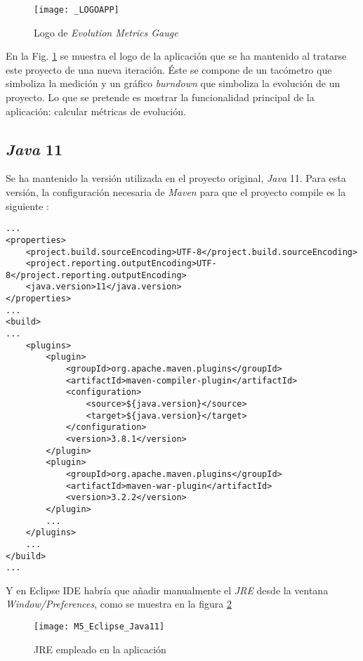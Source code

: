 \begin{figure}[!h]
	\centering
	\texttt{[image: \_LOGOAPP]}
	\caption{Logo de \textit{Evolution Metrics Gauge}}\label{fig:_LOGOAPP}
\end{figure}
\FloatBarrier

En la Fig. \ref{fig:_LOGOAPP} se muestra el logo de la aplicación que se ha mantenido al tratarse este proyecto de una nueva iteración. Éste se compone de un tacómetro que simboliza la medición y un gráfico \textit{burndown} que simboliza la evolución de un proyecto. Lo que se pretende es mostrar la funcionalidad principal de la aplicación: calcular métricas de evolución.


\subsection{\textit{Java} 11}
Se ha mantenido la versión utilizada en el proyecto original\cite{TFGPrevio}, \textit{Java} 11.
Para esta versión, la configuración necesaria de \textit{Maven} para que el proyecto compile es la siguiente :

\begin{minipage}{\linewidth}
{\tiny
\begin{verbatim}
...
<properties>
	<project.build.sourceEncoding>UTF-8</project.build.sourceEncoding>
	<project.reporting.outputEncoding>UTF-8</project.reporting.outputEncoding>
	<java.version>11</java.version>
</properties>
...
<build>
...
	<plugins>
		<plugin>
			<groupId>org.apache.maven.plugins</groupId>
			<artifactId>maven-compiler-plugin</artifactId>
			<configuration>
				<source>${java.version}</source>
				<target>${java.version}</target>
			</configuration>
			<version>3.8.1</version>
		</plugin>
		<plugin>
			<groupId>org.apache.maven.plugins</groupId>
			<artifactId>maven-war-plugin</artifactId>
			<version>3.2.2</version>
		</plugin>
		...
	</plugins>
	...
</build>
...
\end{verbatim}
}
\end{minipage}

\newpage
Y en Eclipse IDE habría que añadir manualmente el \textit{JRE} desde la ventana \textit{Window/Preferences}, como se muestra en la figura \ref{fig:M5_Eclipse_Java11} 

\begin{figure}[!h]
	\centering
	\texttt{[image: M5\_Eclipse\_Java11]}
	\caption{JRE empleado en la aplicación}\label{fig:M5_Eclipse_Java11}
\end{figure}
\FloatBarrier


